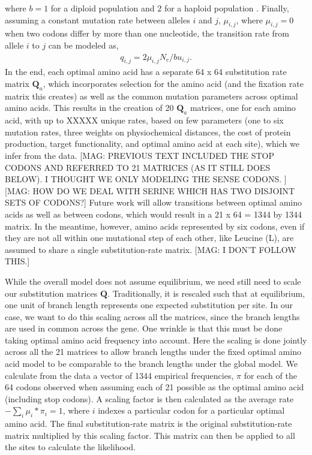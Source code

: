\documentclass{article}
\newcommand{\Qmatrix}{\mathbf{Q}\xspace}
\newcommand{\Qmatrixa}{\ensuremath{\Qmatrix_a}\xspace}
\newcommand{\muij}{\ensuremath{\mu_{i,j}}\xspace}
\newcommand{\Ne}{\ensuremath{{N_e}}\xspace} %
\begin{document}
where $b=1$ for a diploid population and $2$ for a haploid population \cite{Iwasa88,BergAndLassig03,SellaAndHirsh05}.
Finally, assuming a constant mutation rate between alleles $i$ and $j$, $\muij$, where $\muij = 0$ when two codons differ by more than one nucleotide, the transition rate from allele $i$ to $j$ can be modeled as,
\begin{align*}
  q_{i,j} = 2 \muij \Ne/b u_{i,j}.
\end{align*}
In the end, each optimal amino acid has a separate 64 x 64 substitution rate matrix \Qmatrixa, which incorporates selection for the amino acid (and the fixation rate matrix this creates) as well as the common mutation parameters across optimal amino acids. 
This results in the creation of 20  \Qmatrixa  matrices, one for each amino acid, with up to XXXXX unique rates, based on few parameters (one to six mutation rates, three weights on physiochemical distances, the cost of protein production, target functionality, and optimal amino acid at each site), which we infer from the data.
[MAG: PREVIOUS TEXT INCLUDED THE STOP CODONS AND REFERRED TO 21 MATRICES (AS IT STILL DOES BELOW). 
I THOUGHT WE ONLY MODELING THE SENSE CODONS. ]
[MAG: HOW DO WE DEAL WITH SERINE WHICH HAS TWO DISJOINT SETS OF CODONS?]
Future work will allow transitions between optimal amino acids as well as between codons, which would result in a 21 x 64 = 1344 by 1344 matrix. 
In the meantime, however, amino acids represented by six codons, even if they are not all within one mutational step of each other, like Leucine (L), are assumed to share a single substitution-rate matrix. [MAG: I DON'T FOLLOW THIS.]

While the overall model does not assume equilibrium, we need still need to scale our substitution matrices $\Qmatrix$.
Traditionally, it is rescaled such that at equilibrium, one unit of branch length represents one expected substitution per site.
In our case, we want to do this scaling across all the matrices, since the branch lengths are used in common across the gene.
One wrinkle is that this must be done taking optimal amino acid frequency into account. 
Here the scaling is done jointly across all the 21 matrices to allow branch lengths under the fixed optimal amino acid model to be comparable to the branch lengths under the global model.
We calculate from the data a vector of 1344 empirical frequencies, $\pi$ for each of the 64 codons observed when assuming each of 21 possible as the optimal amino acid (including stop codons).
A scaling factor is then calculated as the average rate $-\sum_i{} \mu_i*\pi_i=1$, where $i$ indexes a particular codon for a particular optimal amino acid.
The final substitution-rate matrix is the original substitution-rate matrix multiplied by this scaling factor.
This matrix can then be applied to all the sites to calculate the likelihood. 
\end{document}
